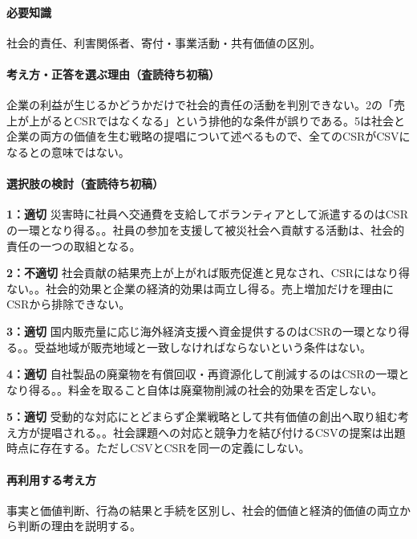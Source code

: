 \paragraph{必要知識} 社会的責任、利害関係者、寄付・事業活動・共有価値の区別。

\paragraph{考え方・正答を選ぶ理由（査読待ち初稿）} 企業の利益が生じるかどうかだけで社会的責任の活動を判別できない。2の「売上が上がるとCSRではなくなる」という排他的な条件が誤りである。5は社会と企業の両方の価値を生む戦略の提唱について述べるもので、全てのCSRがCSVになるとの意味ではない。

\paragraph{選択肢の検討（査読待ち初稿）}\mbox{}\par

\noindent\textbf{1：適切} 災害時に社員へ交通費を支給してボランティアとして派遣するのはCSRの一環となり得る。。社員の参加を支援して被災社会へ貢献する活動は、社会的責任の一つの取組となる。\par

\noindent\textbf{2：不適切} 社会貢献の結果売上が上がれば販売促進と見なされ、CSRにはなり得ない。。社会的効果と企業の経済的効果は両立し得る。売上増加だけを理由にCSRから排除できない。\par

\noindent\textbf{3：適切} 国内販売量に応じ海外経済支援へ資金提供するのはCSRの一環となり得る。。受益地域が販売地域と一致しなければならないという条件はない。\par

\noindent\textbf{4：適切} 自社製品の廃棄物を有償回収・再資源化して削減するのはCSRの一環となり得る。。料金を取ること自体は廃棄物削減の社会的効果を否定しない。\par

\noindent\textbf{5：適切} 受動的な対応にとどまらず企業戦略として共有価値の創出へ取り組む考え方が提唱される。。社会課題への対応と競争力を結び付けるCSVの提案は出題時点に存在する。ただしCSVとCSRを同一の定義にしない。\par

\paragraph{再利用する考え方} 事実と価値判断、行為の結果と手続を区別し、社会的価値と経済的価値の両立から判断の理由を説明する。

